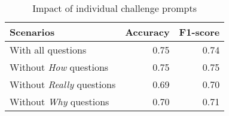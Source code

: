 \begin{table}[]
    \centering
    \caption{Impact of individual challenge prompts}
    \begin{tabular}{lrr}
    \toprule
\textbf{Scenarios} & \textbf{Accuracy} & \textbf{F1-score} \\ \midrule
With all questions & 0.75 & 0.74 \\
Without \textit{How} questions & 0.75 & 0.75 \\
Without \textit{Really} questions & 0.69 & 0.70 \\ 
Without \textit{Why} questions & 0.70 & 0.71 \\ 
\bottomrule         
    \end{tabular}
    \label{tab:challenge_question_impact}
\end{table}